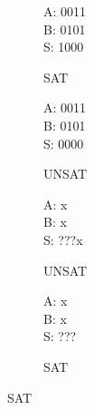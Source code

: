 \begin{figure}[p]
  \begin{center}
    \begin{subfigure}[b]{0.23\textwidth}
      \begin{diffchar}
        A: 0011 \\
        B: 0101 \\
        S: 1000
      \end{diffchar}
      \caption{SAT}
      \label{dc:tcs-addition-1}
    \end{subfigure}
    \begin{subfigure}[b]{0.23\textwidth}
      \begin{diffchar}
        A: 0011 \\
        B: 0101 \\
        S: 0000
      \end{diffchar}
      \caption{UNSAT}
      \label{dc:tcs-addition-2}
    \end{subfigure}
    \begin{subfigure}[b]{0.23\textwidth}
      \begin{diffchar}
       A: \textendash{}\textendash{}\textendash{}x \\
       B: \textendash{}\textendash{}\textendash{}x \\
       S: ???x
      \end{diffchar}
      \caption{UNSAT}
      \label{dc:tcs-addition-3}
    \end{subfigure}
    \begin{subfigure}[b]{0.23\textwidth}
      \begin{diffchar}
        A: \textendash{}\textendash{}\textendash{}x \\
        B: \textendash{}\textendash{}\textendash{}x \\
        S: ???\textendash{}
      \end{diffchar}
      \caption{SAT}
      \label{dc:tcs-addition-4}
    \end{subfigure}
  \end{center}%


\end{figure}

